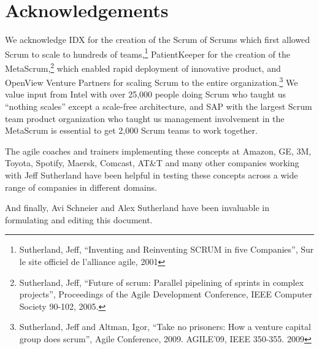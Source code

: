 \documentclass[12pt,a4paper,parskip=full]{scrartcl}
\begin{document}
\section{Acknowledgements}
We acknowledge IDX for the creation of the Scrum of Scrums which first
allowed Scrum to scale to hundreds of teams,\footnote{Sutherland, Jeff,
``Inventing and Reinventing SCRUM in five Companies'', Sur le site officiel
de l'alliance agile, 2001} PatientKeeper for the creation of the
MetaScrum,\footnote{Sutherland, Jeff, ``Future of scrum: Parallel pipelining
of sprints in complex projects'', Proceedings of the Agile Development
Conference,  IEEE Computer Society 90-102,  2005.} which enabled rapid
deployment of innovative product, and OpenView Venture Partners for scaling
Scrum to the entire organization.\footnote{Sutherland, Jeff and Altman,
Igor, ``Take no prisoners: How a venture capital group does scrum'', Agile
Conference, 2009. AGILE'09, IEEE 350-355.  2009} We value input from Intel
with over 25,000 people doing Scrum who taught us ``nothing scales'' except
a scale-free architecture, and SAP with the largest Scrum team product
organization who taught us management involvement in the MetaScrum is
essential to get 2,000 Scrum teams to work together.

The agile coaches and trainers implementing these concepts at Amazon, GE,
3M, Toyota, Spotify, Maersk, Comcast, AT\&T and many other companies working with Jeff Sutherland
have been helpful in testing these concepts across a wide range of
companies in different domains.

And finally, Avi Schneier and Alex Sutherland have been invaluable in
formulating and editing this document.

\pagebreak

\printbibliography
\end{document}
